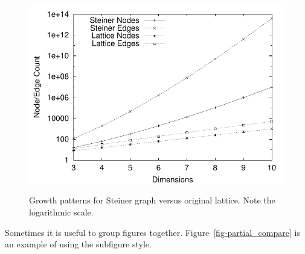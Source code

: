 \documentclass[12pt]{dalcsthesis}
\begin{document}
\begin{figure}
  \centering
     {\includegraphics[height = 3.0 in]{samplefig}}
  \caption{\label{fig-steiner_growth} Growth patterns for Steiner
    graph versus original lattice. Note the logarithmic scale.}
\end{figure}

Sometimes it is useful to group figures together. 
Figure~\ref{fig-partial_compare} is an example of using the subfigure style.
\end{document}
